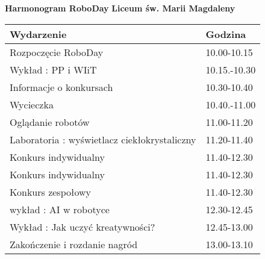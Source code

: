\documentclass{article}
\begin{document}
\begin{center}
\Large\textbf{Harmonogram RoboDay}
\large\textbf{Liceum św. Marii Magdaleny}
\end{center}
\vspace{1cm}
\begin{center}
\begin{tabular}{|l|l|}
\hline
\textbf{Wydarzenie} & \textbf{Godzina} \\
\hline
Rozpoczęcie RoboDay & 10.00-10.15 \\
\hline
Wykład : PP i WIiT & 10.15.-10.30 \\
\hline
Informacje o konkursach & 10.30-10.40 \\
\hline
Wycieczka & 10.40.-11.00 \\
\hline
Oglądanie robotów & 11.00-11.20 \\
\hline
Laboratoria : wyświetlacz ciekłokrystaliczny & 11.20-11.40 \\
\hline
Konkurs indywidualny & 11.40-12.30 \\
\hline
Konkurs indywidualny & 11.40-12.30 \\
\hline
Konkurs zespołowy & 11.40-12.30 \\
\hline
wykład : AI w robotyce & 12.30-12.45 \\
\hline
Wykład : Jak uczyć kreatywności? & 12.45-13.00 \\
\hline
Zakończenie i rozdanie nagród & 13.00-13.10 \\
\hline
\end{tabular}
\end{center}
\end{document}
